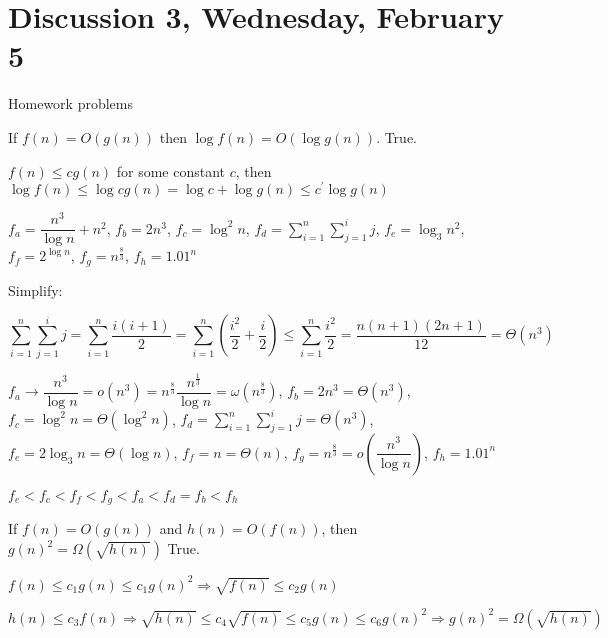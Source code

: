 \section{Discussion 3, Wednesday, February 5}

Homework problems

\begin{prob}

If $f(n) = O(g(n))$ then $\log f(n) = O(\log g(n))$. True.

$f(n) \leq cg(n)$ for some constant $c$, then $\log f(n) \leq \log cg(n) = \log c + \log g(n) \leq c^\prime \log g(n)$

\end{prob}

\begin{prob}

$f_a = \dfrac{n^3}{\log n} + n^2$, $f_b = 2n^3$, $f_c = \log^2 n$, $f_d = \sum_{i = 1}^{n} \sum_{j = 1}^{i} j$, $f_e = \log_3 n^2$, $f_f = 2^{\log n}$, $f_g = n^{\tfrac{8}{3}}$, $f_h = 1.01^n$

Simplify:

$$\sum_{i = 1}^{n} \sum_{j = 1}^{i} j = \sum_{i = 1}^{n} \dfrac{i(i + 1)}{2} = \sum_{i = 1}^{n} \left ( \dfrac{i^2}{2} + \dfrac{i}{2} \right ) \leq \sum_{i = 1}^{n} \dfrac{i^2}{2} = \dfrac{n(n+1)(2n + 1)}{12} = \Theta(n^3)$$

$f_a \rightarrow \dfrac{n^3}{\log n} = o(n^3)= n^{\tfrac{8}{3}} \dfrac{n^{\tfrac{1}{3}}}{\log n} = \omega(n^{\tfrac{8}{3}})$, $f_b = 2n^3 = \Theta(n^3)$, $f_c = \log^2 n = \Theta(\log^2 n)$, $f_d = \sum_{i = 1}^{n} \sum_{j = 1}^{i} j = \Theta(n^3)$, $f_e = 2 \log_3 n = \Theta(\log n)$, $f_f = n = \Theta(n)$, $f_g = n^{\tfrac{8}{3}} = o \left ( \dfrac{n^3}{\log n} \right )$, $f_h = 1.01^n$

$f_e < f_c < f_f < f_g < f_a < f_d = f_b < f_h$

\end{prob}

\begin{prob}

If $f(n) = O(g(n))$ and $h(n) = O(f(n))$, then $g(n)^2 = \Omega\left(\sqrt{h(n)}\right)$ True.

$f(n) \leq c_1 g(n) \leq c_1 g(n)^2 \Rightarrow \sqrt{f(n)} \leq c_2 g(n)$

$h(n) \leq c_3 f(n) \Rightarrow \sqrt{h(n)} \leq c_4 \sqrt{f(n)} \leq c_5 g(n) \leq c_6 g(n)^2 \Rightarrow g(n)^2 = \Omega \left(\sqrt{h(n)}\right)$


\end{prob}
